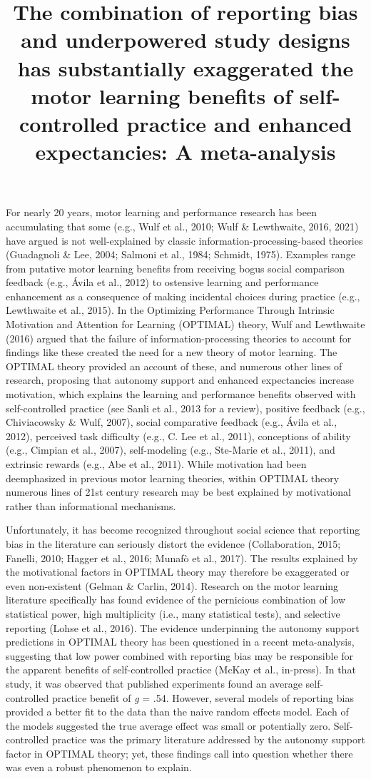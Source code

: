 \documentclass[
  doc, donotrepeattitle,floatsintext]{apa7}
\title{The combination of reporting bias and underpowered study designs has substantially exaggerated the motor learning benefits of self-controlled practice and enhanced expectancies: A meta-analysis}
\author{\phantom{0}}
\date{}
\affiliation{\phantom{0}}
\begin{document}
\maketitle

For nearly 20 years, motor learning and performance research has been accumulating that some (e.g., Wulf et al., 2010; Wulf \& Lewthwaite, 2016, 2021) have argued is not well-explained by classic information-processing-based theories (Guadagnoli \& Lee, 2004; Salmoni et al., 1984; Schmidt, 1975). Examples range from putative motor learning benefits from receiving bogus social comparison feedback (e.g., Ávila et al., 2012) to ostensive learning and performance enhancement as a consequence of making incidental choices during practice (e.g., Lewthwaite et al., 2015). In the Optimizing Performance Through Intrinsic Motivation and Attention for Learning (OPTIMAL) theory, Wulf and Lewthwaite (2016) argued that the failure of information-processing theories to account for findings like these created the need for a new theory of motor learning. The OPTIMAL theory provided an account of these, and numerous other lines of research, proposing that autonomy support and enhanced expectancies increase motivation, which explains the learning and performance benefits observed with self-controlled practice (see Sanli et al., 2013 for a review), positive feedback (e.g., Chiviacowsky \& Wulf, 2007), social comparative feedback (e.g., Ávila et al., 2012), perceived task difficulty (e.g., C. Lee et al., 2011), conceptions of ability (e.g., Cimpian et al., 2007), self-modeling (e.g., Ste-Marie et al., 2011), and extrinsic rewards (e.g., Abe et al., 2011). While motivation had been deemphasized in previous motor learning theories, within OPTIMAL theory numerous lines of 21st century research may be best explained by motivational rather than informational mechanisms.

Unfortunately, it has become recognized throughout social science that reporting bias in the literature can seriously distort the evidence (Collaboration, 2015; Fanelli, 2010; Hagger et al., 2016; Munafò et al., 2017). The results explained by the motivational factors in OPTIMAL theory may therefore be exaggerated or even non-existent (Gelman \& Carlin, 2014). Research on the motor learning literature specifically has found evidence of the pernicious combination of low statistical power, high multiplicity (i.e., many statistical tests), and selective reporting (Lohse et al., 2016). The evidence underpinning the autonomy support predictions in OPTIMAL theory has been questioned in a recent meta-analysis, suggesting that low power combined with reporting bias may be responsible for the apparent benefits of self-controlled practice (McKay et al., in-press). In that study, it was observed that published experiments found an average self-controlled practice benefit of \emph{g} = .54. However, several models of reporting bias provided a better fit to the data than the naive random effects model. Each of the models suggested the true average effect was small or potentially zero. Self-controlled practice was the primary literature addressed by the autonomy support factor in OPTIMAL theory; yet, these findings call into question whether there was even a robust phenomenon to explain.
\end{document}
